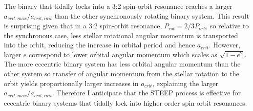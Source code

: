 The binary that tidally locks into a 3:2 spin-orbit resonance reaches a larger $a_{crit,max}/a_{crit,init}$ than the other synchronously rotating binary system.  This result is surprising given that in a 3:2 spin-orbit resonance, $P_{rot} = 2/3 P_{orb}$, so relative to the synchronous case, less stellar rotational angular momentum is transported into the orbit, reducing the increase in orbital period and hence $a_{crit}$.  However, larger $e$ correspond to lower orbital angular momentum which scales as $\sqrt{1-e^2}$.  The more eccentric binary system has less orbital angular momentum than the other system so transfer of angular momentum from the stellar rotation to the orbit yields proportionally larger increases in $a_{crit}$, explaining the larger $a_{crit,max}/a_{crit,init}$.  Therefore I anticipate that the STEEP process is effective for eccentric binary systems that tidally lock into higher order spin-orbit resonances.

